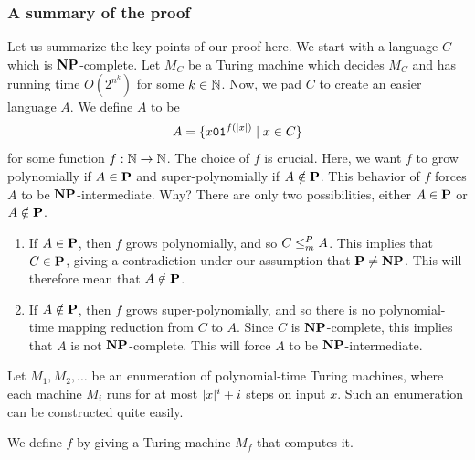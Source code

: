 \subsubsection{A summary of the proof}
Let us summarize the key points of our proof here. We start with a language $C$ which is $\textbf{NP}$-complete. Let $M_C$ be a Turing machine which decides $M_C$ and has running time $O(2^{n^k})$ for some $k \in \mathbb N$. Now, we pad $C$ to create an easier language $A$. We define $A$ to be
\[ A = \{ x\texttt{0}\texttt{1}^{f(| x |)} \mid x \in C \} \]
for some function $f : \mathbb N \to \mathbb N$. The choice of $f$ is crucial. Here, we want $f$ to grow polynomially if $A \in \textbf{P}$ and super-polynomially if $A \notin \textbf{P}$. This behavior of $f$ forces $A$ to be $\textbf{NP}$-intermediate. Why? There are only two possibilities, either $A \in \textbf{P}$ or $A \notin \textbf{P}$.
\begin{enumerate}
  \item If $A \in \textbf{P}$, then $f$ grows polynomially, and so $C \leq_m^P A$. This implies that $C \in \textbf{P}$, giving a contradiction under our assumption that $\textbf{P} \neq \textbf{NP}$. This will therefore mean that $A \notin \textbf{P}$.
  \item If $A \notin \textbf{P}$, then $f$ grows super-polynomially, and so there is no polynomial-time mapping reduction from $C$ to $A$. Since $C$ is $\textbf{NP}$-complete, this implies that $A$ is not $\textbf{NP}$-complete. This will force $A$ to be $\textbf{NP}$-intermediate.
\end{enumerate}
Let $M_1, M_2, \dots$ be an enumeration of polynomial-time Turing machines, where each machine $M_i$ runs for at most $| x |^i + i$ steps on input $x$. Such an enumeration can be constructed quite easily.

We define $f$ by giving a Turing machine $M_f$ that computes it.

